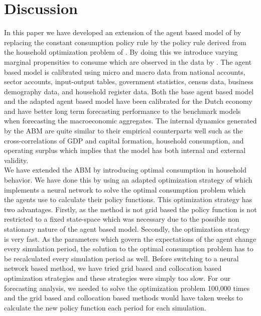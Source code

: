 
\section{Discussion} %

\label{Discussion} %

In this paper we have developed an extension of the agent based model of \cite{poledna_economic_2019} by replacing the constant consumption policy rule by the policy rule derived from the household optimization problem of \cite{kaplan_monetary_2018}. By doing this we introduce varying marginal propensities to consume which are observed in the data by \cite{fagereng_mpc_2021}. The agent based model is calibrated using micro and macro data from national accounts, sector accounts, input-output tables, government statistics, census data, business demography data, and household register data. Both the base agent based model and the adapted agent based model have been calibrated for the Dutch economy and have better long term forecasting performance to the benchmark models when forecasting the macroeconomic aggregates. The internal dynamics generated by the ABM are quite similar to their empirical counterparts well such as the cross-correlations of GDP and capital formation, household consumption, and operating surplus which implies that the model has both internal and external validity.\\

We have extended the ABM by introducing optimal consumption in household behavior. We have done this by using an adapted optimization strategy of \cite{maliar_deep_2021} which implements a neural network to solve the optimal consumption problem which the agents use to calculate their policy functions. This optimization strategy has two advantages. Firstly, as the method is not grid based the policy function is not restricted to a fixed state-space which was necessary due to the possible non stationary nature of the agent based model. Secondly, the optimization strategy is very fast. As the parameters which govern the expectations of the agent change every simulation period, the solution to the optimal consumption problem has to be recalculated every simulation period as well. Before switching to a neural network based method, we have tried grid based and collocation based optimization strategies and these strategies were simply too slow. For our forecasting analysis, we needed to solve the optimization problem 100,000 times and the grid based and collocation based methods would have taken weeks to calculate the new policy function each period for each simulation.\\

